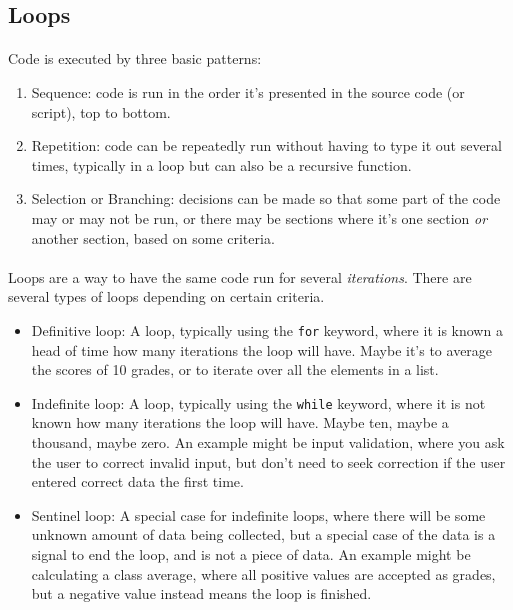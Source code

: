 \documentclass[letter,10pt]{article}
\begin{document}
\subsection{Loops}
\paragraph{}Code is executed by three basic patterns:
\begin{enumerate}
    \item Sequence: code is run in the order it's presented in the source code (or script), top to bottom.
    \item Repetition: code can be repeatedly run without having to type it out several times, typically in a loop but can also be a recursive function.
    \item Selection or Branching: decisions can be made so that some part of the code may or may not be run, or there may be sections where it's one section \textit{or} another section, based on some criteria.
\end{enumerate}

\paragraph{}Loops are a way to have the same code run for several \textit{iterations}. There are several types of loops depending on certain criteria.
\begin{itemize}
    \item Definitive loop: A loop, typically using the \verb|for| keyword, where it is known a head of time how many iterations the loop will have. Maybe it's to average the scores of 10 grades, or to iterate over all the elements in a list.
    \item Indefinite loop: A loop, typically using the \verb|while| keyword, where it is not known how many iterations the loop will have. Maybe ten, maybe a thousand, maybe zero. An example might be input validation, where you ask the user to correct invalid input, but don't need to seek correction if the user entered correct data the first time.
    \item Sentinel loop: A special case for indefinite loops, where there will be some unknown amount of data being collected, but a special case of the data is a signal to end the loop, and is not a piece of data. An example might be calculating a class average, where all positive values are accepted as grades, but a negative value instead means the loop is finished.
\end{itemize}
\end{document}
